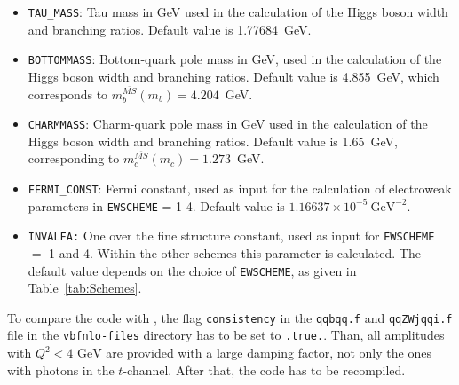 \documentclass[a4paper,11pt]{article}
\begin{document}
\begin{itemize}
\item {\tt TAU\_MASS}: Tau mass in GeV used in the calculation of the Higgs boson
width and branching ratios. Default value is 1.77684~GeV. 
\item {\tt BOTTOMMASS}: Bottom-quark pole mass in GeV, used in the calculation
of the Higgs boson width and branching ratios. Default value is
4.855~GeV, which corresponds to $m_{b}^{\overline{MS}}(m_{b}) = 4.204$~GeV.
\item {\tt CHARMMASS}: Charm-quark pole mass in GeV used in the calculation of
the Higgs boson width and branching ratios. Default value is 1.65~GeV,
corresponding to $m_{c}^{\overline{MS}}(m_{c}) = 1.273$~GeV.
\item {\tt FERMI\_CONST}: Fermi constant, used as input for the calculation of
electroweak parameters in {\tt EWSCHEME} = 1-4. Default value is $1.16637 \times
10^{-5} \ \mathrm{GeV}^{-2}$. 
\item {\tt INVALFA:} One over the fine structure constant, used as input for
{\tt EWSCHEME} $=$ 1 and 4.  Within the other schemes this parameter is
calculated. The default value depends on the choice of {\tt EWSCHEME}, as given
in Table~\ref{tab:Schemes}.
\end{itemize} 
To compare the code with \cite{JSZ}, the flag {\tt consistency} in the {\tt qqbqq.f} and 
{\tt qqZWjqqi.f} file in the {\tt vbfnlo-files} directory has to be set to {\tt .true.}. 
Than, all amplitudes with $Q^2<4 \text{~GeV}$ are provided with a large damping factor, not 
only the ones with photons in the $t$-channel. After that, the code has to be recompiled. 
\end{document}
